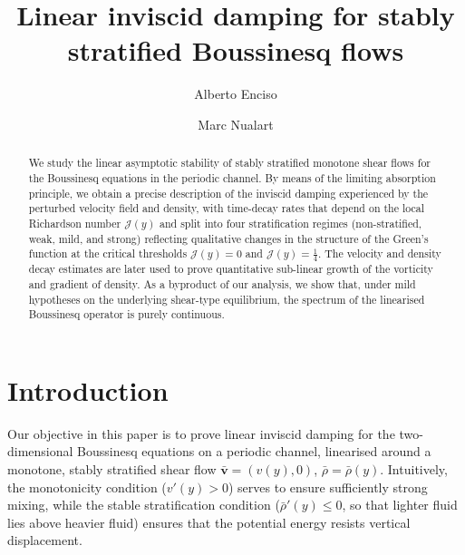 \documentclass[11pt,reqno]{amsproc}
\theoremstyle{definition}
\numberwithin{equation}{section}
\newcommand{\cJ}{{\mathcal{J}}}
\renewcommand{\v}{\boldsymbol{v}}
\begin{document}
\title{Linear inviscid damping for stably stratified Boussinesq flows} 

\author[A. Enciso]{Alberto Enciso}
\address{Instituto de Ciencias Matem\'{a}ticas, Consejo Superior de Investigaciones Cient\'{i}ficas, Madrid, Spain}

\author[M. Nualart]{Marc Nualart}
\address{Instituto de Ciencias Matem\'{a}ticas, Consejo Superior de Investigaciones Cient\'{i}ficas, Madrid, Spain}





\begin{abstract}
We study the linear asymptotic stability of stably stratified monotone shear flows for the Boussinesq equations in the periodic channel. By means of the limiting absorption principle, we obtain a precise description of the inviscid damping experienced by the perturbed velocity field and density, with time-decay rates that depend on the local Richardson number $\cJ(y)$ and split into four stratification regimes (non-stratified, weak, mild, and strong) reflecting qualitative changes in the structure of the Green's function at the critical thresholds $\cJ(y)=0$ and $\cJ(y) = \frac14$. The velocity and density decay estimates are later used to prove quantitative sub-linear growth of the vorticity and gradient of density. As a byproduct of our analysis, we show that, under mild hypotheses on the underlying shear-type equilibrium, the spectrum of the linearised Boussinesq operator is purely continuous.
\end{abstract}

\maketitle



\setcounter{tocdepth}{2}
\tableofcontents

\section{Introduction}\label{inviscid}

Our objective in this paper is to prove linear inviscid damping for the two-dimensional Boussinesq equations on a periodic channel, linearised around a monotone, stably stratified shear flow $\bar{\v}=(v(y),0)$, $\bar{\rho}=\bar{\rho}(y)$. Intuitively, the monotonicity condition ($v'(y)>0$) serves to ensure sufficiently strong mixing, while the stable stratification condition ($\bar\rho'(y)\leq0$, so that  lighter fluid lies above heavier fluid) ensures that the potential energy resists vertical displacement.
\end{document}
